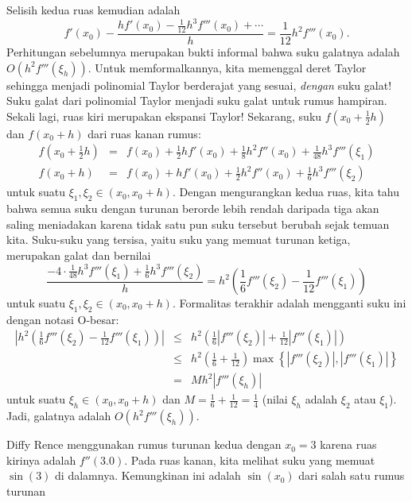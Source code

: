 \begin{description}
\noindent Selisih kedua ruas kemudian adalah
\[
f'(x_{0})-\frac{hf'(x_{0})-\frac{1}{12}h^{3}f'''(x_{0})+\cdots}{h}=\frac{1}{12}h^{2}f'''(x_{0}).
\]
Perhitungan sebelumnya merupakan bukti informal bahwa suku galatnya
adalah $O(h^{2}f'''(\xi_{h}))$. Untuk memformalkannya, kita memenggal
deret Taylor sehingga menjadi polinomial Taylor berderajat yang sesuai,
\textit{dengan} suku galat! Suku galat dari polinomial Taylor menjadi
suku galat untuk rumus hampiran. Sekali lagi, ruas kiri merupakan
ekspansi Taylor! Sekarang, suku $f(x_{0}+\frac{1}{2}h)$ dan $f(x_{0}+h)$
dari ruas kanan rumus:
\begin{eqnarray*}
f\left(x_{0}+\frac{1}{2}h\right) & = & f(x_{0})+\frac{1}{2}hf'(x_{0})+\frac{1}{8}h^{2}f''(x_{0})+\frac{1}{48}h^{3}f'''(\xi_{1})\\
f\left(x_{0}+h\right) & = & f(x_{0})+hf'(x_{0})+\frac{1}{2}h^{2}f''(x_{0})+\frac{1}{6}h^{3}f'''(\xi_{2})
\end{eqnarray*}
untuk suatu $\xi_{1},\xi_{2}\in(x_{0},x_{0}+h)$. Dengan mengurangkan
kedua ruas, kita tahu bahwa semua suku dengan turunan berorde lebih
rendah daripada tiga akan saling meniadakan karena tidak satu pun
suku tersebut berubah sejak temuan kita. Suku-suku yang tersisa, yaitu
suku yang memuat turunan ketiga, merupakan galat dan bernilai
\[
\frac{-4\cdot\frac{1}{48}h^{3}f'''(\xi_{1})+\frac{1}{6}h^{3}f'''(\xi_{2})}{h}=h^{2}\left(\frac{1}{6}f'''(\xi_{2})-\frac{1}{12}f'''(\xi_{1})\right)
\]
untuk suatu $\xi_{1},\xi_{2}\in(x_{0},x_{0}+h)$. Formalitas terakhir
adalah mengganti suku ini dengan notasi O-besar:
\begin{eqnarray*}
\left|h^{2}\left(\frac{1}{6}f'''(\xi_{2})-\frac{1}{12}f'''(\xi_{1})\right)\right| & \leq & h^{2}\left(\frac{1}{6}\left|f'''(\xi_{2})\right|+\frac{1}{12}\left|f'''(\xi_{1})\right|\right)\\
 & \leq & h^{2}\left(\frac{1}{6}+\frac{1}{12}\right)\max\left\{ \left|f'''(\xi_{2})\right|,\left|f'''(\xi_{1})\right|\right\} \\
 & = & Mh^{2}\left|f'''(\xi_{h})\right|
\end{eqnarray*}
untuk suatu $\xi_{h}\in(x_{0},x_{0}+h)$ dan $M=\frac{1}{6}+\frac{1}{12}=\frac{1}{4}$
(nilai $\xi_{h}$ adalah $\xi_{2}$ atau $\xi_{1}$). Jadi, galatnya
adalah $O(h^{2}f'''(\xi_{h}))$.
\item [{\ref{exc:calculusErrors-17}:}] Diffy Rence menggunakan rumus turunan
kedua dengan $x_{0}=3$ karena ruas kirinya adalah $f''(3.0)$. Pada
ruas kanan, kita melihat suku yang memuat $\sin(3)$ di dalamnya.
Kemungkinan ini adalah $\sin(x_{0})$ dari salah satu rumus turunan

\end{description}
